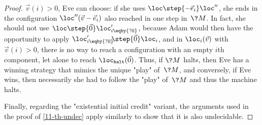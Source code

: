 \begin{proof}
  $\vec v(i)>0$, Eve can choose: if she uses
  $\loc\step{-\vec e_i}\loc''$, she ends in the configuration
  $\loc''(\vec v-\vec e_i)$ also reached in one step in~$\?M$.  In
  fact, she should not use $\loc\step{\vec 0}\loc'_{i\eqby{?0}}$,
  because Adam would then have the opportunity to apply
  $\loc'_{i\eqby{?0}}\!\!\step{\vec 0}\loc_{i}$, and in
  $\loc_{i}(\vec v)$ with $\vec v(i)>0$, there is no way to
  reach a configuration with an empty $i$th component, let alone to
  reach $\loc_\mathtt{halt}(\vec 0)$.  Thus, if $\?M$ halts, then Eve
  has a winning strategy that mimics the unique "play"
  of~$\?M$, and conversely, if Eve wins, then necessarily she had to
  follow the "play" of~$\?M$ and thus the machine halts.

  \medskip Finally, regarding the "existential initial credit"
  variant, the arguments used in the proof of \cref{11-th-undec} apply
  similarly to show that it is also undecidable.
\end{proof}

